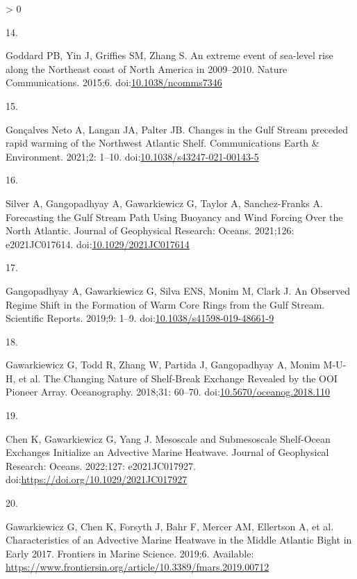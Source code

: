 \documentclass[
  10pt,
]{article}
\newlength{\cslhangindent}
\newlength{\csllabelwidth}
\newenvironment{CSLReferences}[2] %
 {%
  \setlength{\parindent}{0pt}
  \ifodd #1 \everypar{\setlength{\hangindent}{\cslhangindent}}\ignorespaces\fi
  \ifnum #2 > 0
  \setlength{\parskip}{#2\baselineskip}
  \fi
 }%
 {}
\newcommand{\CSLLeftMargin}[1]{\parbox[t]{\csllabelwidth}{#1}}
\newcommand{\CSLRightInline}[1]{\parbox[t]{\linewidth - \csllabelwidth}{#1}\break}
\begin{document}
\begin{CSLReferences}{0}{0}
\leavevmode\hypertarget{ref-goddard_extreme_2015}{}%
\CSLLeftMargin{14. }
\CSLRightInline{Goddard PB, Yin J, Griffies SM, Zhang S. An extreme
event of sea-level rise along the {Northeast} coast of {North} {America}
in 2009--2010. Nature Communications. 2015;6.
doi:\href{https://doi.org/10.1038/ncomms7346}{10.1038/ncomms7346}}

\leavevmode\hypertarget{ref-goncalves_neto_changes_2021}{}%
\CSLLeftMargin{15. }
\CSLRightInline{Gonçalves Neto A, Langan JA, Palter JB. Changes in the
{Gulf} {Stream} preceded rapid warming of the {Northwest} {Atlantic}
{Shelf}. Communications Earth \& Environment. 2021;2: 1--10.
doi:\href{https://doi.org/10.1038/s43247-021-00143-5}{10.1038/s43247-021-00143-5}}

\leavevmode\hypertarget{ref-silver_forecasting_2021}{}%
\CSLLeftMargin{16. }
\CSLRightInline{Silver A, Gangopadhyay A, Gawarkiewicz G, Taylor A,
Sanchez-Franks A. Forecasting the {Gulf} {Stream} {Path} {Using}
{Buoyancy} and {Wind} {Forcing} {Over} the {North} {Atlantic}. Journal
of Geophysical Research: Oceans. 2021;126: e2021JC017614.
doi:\href{https://doi.org/10.1029/2021JC017614}{10.1029/2021JC017614}}

\leavevmode\hypertarget{ref-gangopadhyay_observed_2019}{}%
\CSLLeftMargin{17. }
\CSLRightInline{Gangopadhyay A, Gawarkiewicz G, Silva ENS, Monim M,
Clark J. An {Observed} {Regime} {Shift} in the {Formation} of {Warm}
{Core} {Rings} from the {Gulf} {Stream}. Scientific Reports. 2019;9:
1--9.
doi:\href{https://doi.org/10.1038/s41598-019-48661-9}{10.1038/s41598-019-48661-9}}

\leavevmode\hypertarget{ref-gawarkiewicz_changing_2018}{}%
\CSLLeftMargin{18. }
\CSLRightInline{Gawarkiewicz G, Todd R, Zhang W, Partida J, Gangopadhyay
A, Monim M-U-H, et al. The {Changing} {Nature} of {Shelf}-{Break}
{Exchange} {Revealed} by the {OOI} {Pioneer} {Array}. Oceanography.
2018;31: 60--70.
doi:\href{https://doi.org/10.5670/oceanog.2018.110}{10.5670/oceanog.2018.110}}

\leavevmode\hypertarget{ref-chen_mesoscale_2022}{}%
\CSLLeftMargin{19. }
\CSLRightInline{Chen K, Gawarkiewicz G, Yang J. Mesoscale and
{Submesoscale} {Shelf}-{Ocean} {Exchanges} {Initialize} an {Advective}
{Marine} {Heatwave}. Journal of Geophysical Research: Oceans. 2022;127:
e2021JC017927. doi:\url{https://doi.org/10.1029/2021JC017927}}

\leavevmode\hypertarget{ref-gawarkiewicz_characteristics_2019}{}%
\CSLLeftMargin{20. }
\CSLRightInline{Gawarkiewicz G, Chen K, Forsyth J, Bahr F, Mercer AM,
Ellertson A, et al. Characteristics of an {Advective} {Marine}
{Heatwave} in the {Middle} {Atlantic} {Bight} in {Early} 2017. Frontiers
in Marine Science. 2019;6. Available:
\url{https://www.frontiersin.org/article/10.3389/fmars.2019.00712}}


\end{CSLReferences}
\end{document}
